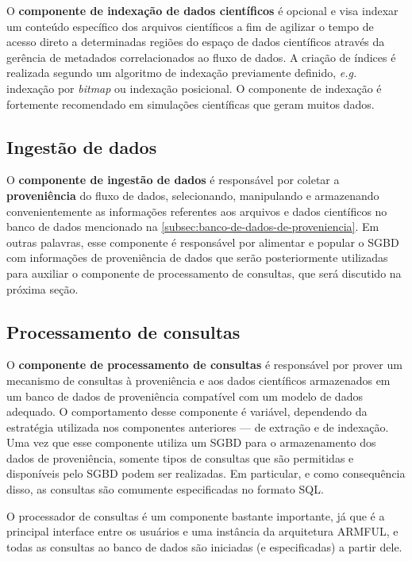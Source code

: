 O \textbf{componente de indexação de dados científicos} é opcional e visa indexar um conteúdo específico dos arquivos científicos a fim de agilizar o tempo de acesso direto a determinadas regiões do espaço de dados científicos através da gerência de metadados correlacionados ao fluxo de dados. A criação de índices é realizada segundo um algoritmo de indexação previamente definido, \textit{e.g.} indexação por \textit{bitmap} ou indexação posicional. O componente de indexação é fortemente recomendado em simulações científicas que geram muitos dados.

\subsection{Ingestão de dados}

O \textbf{componente de ingestão de dados} é responsável por coletar a \textbf{proveniência} do fluxo de dados, selecionando, manipulando e armazenando convenientemente as informações referentes aos arquivos e dados científicos no banco de dados mencionado na \autoref{subsec:banco-de-dados-de-proveniencia}. Em outras palavras, esse componente é responsável por alimentar e popular o SGBD com informações de proveniência de dados que serão posteriormente utilizadas para auxiliar o componente de processamento de consultas, que será discutido na próxima seção.


\subsection{Processamento de consultas}

O \textbf{componente de processamento de consultas} é responsável por prover um mecanismo de consultas à proveniência e aos dados científicos armazenados em um banco de dados de proveniência compatível com um modelo de dados adequado. O comportamento desse componente é variável, dependendo da estratégia utilizada nos componentes anteriores --- de extração e de indexação. Uma vez que esse componente utiliza um SGBD para o armazenamento dos dados de proveniência, somente tipos de consultas que são permitidas e disponíveis pelo SGBD podem ser realizadas. Em particular, e como consequência disso, as consultas são comumente especificadas no formato SQL.

O processador de consultas é um componente bastante importante, já que é a principal interface entre os usuários e uma instância da arquitetura ARMFUL, e todas as consultas ao banco de dados são iniciadas (e especificadas) a partir dele.

